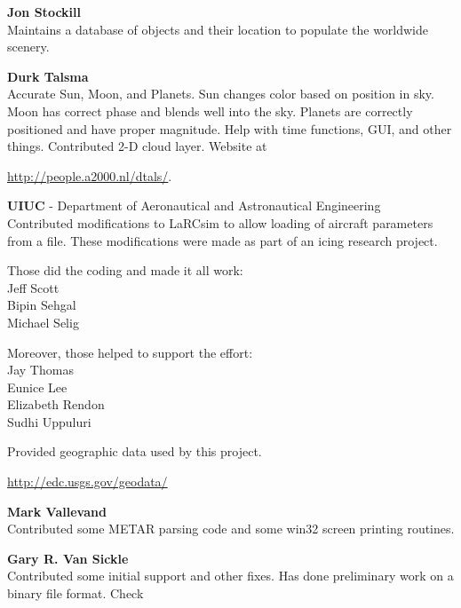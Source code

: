 \noindent \textbf{Jon Stockill}\\
  Maintains a database of objects and their location to populate the worldwide scenery.
\medskip

\noindent \textbf{Durk Talsma}\\
  Accurate Sun, Moon, and Planets.  Sun changes color based on
  position in sky. Moon has correct phase and blends well into the
  sky.  Planets are correctly positioned and have proper magnitude. Help with time
  functions, GUI, and other things. Contributed 2-D cloud layer. Website
  at
   \medskip

 \href{http://people.a2000.nl/dtals/}{http://people.a2000.nl/dtals/}.
 \medskip

\noindent \textbf{UIUC} - Department of Aeronautical and Astronautical
Engineering\\
  Contributed modifications to LaRCsim to allow loading of aircraft
  parameters from a file.  These modifications were made as part of an
  icing research project.
  \medskip

  Those did the coding and made it all work:\\
      Jeff Scott\\
      Bipin Sehgal\\
      Michael Selig
  \medskip

  Moreover, those helped to support the effort:\\
      Jay Thomas\\
      Eunice Lee\\
      Elizabeth Rendon\\
      Sudhi Uppuluri
  \medskip


\noindent
 \textbf{}
  \medskip

  Provided geographic data used by this project.
 \medskip

\href{http://edc.usgs.gov/geodata/}{http://edc.usgs.gov/geodata/}
 \medskip

\noindent \textbf{Mark Vallevand}\\
  Contributed some METAR parsing code and some win32 screen printing routines.
\medskip

\noindent \textbf{Gary R. Van Sickle}\\
  Contributed some initial  support and other fixes. Has done
  preliminary work on a binary file format. Check
  \medskip

